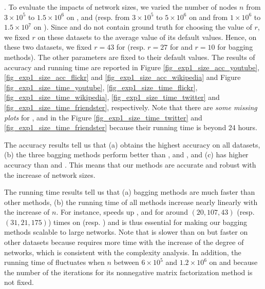 . To evaluate the impacts of network sizes, we varied the
number of nodes $n$ from $3\times 10^5$ to $1.5\times 10^6$ on \YouTube, \Flickr and \Wikipedia (resp.
from $3\times 10^5$ to $5\times 10^6$ on \Twitter and from $1\times 10^6$ to $1.5\times 10^7$ on
\Friendster). Since \Twitter and \Friendster do not contain
ground truth for choosing the value of $r$, we fixed $r$ on these datasets to the average value of
its default values. Hence, on these two datasets, we fixed $r = 43$ for \NMF
(resp. $r = 27$ for \BIGCLAM and $r = 10$ for bagging methods).
The other parameters are fixed to their default values.
The results of accuracy and running time are reported in Figure \ref{fig_exp1_size_acc_youtube},
\ref{fig_exp1_size_acc_flickr} and \ref{fig_exp1_size_acc_wikipedia} and Figure \ref{fig_exp1_size_time_youtube},
\ref{fig_exp1_size_time_flickr}, \ref{fig_exp1_size_time_wikipedia}, \ref{fig_exp1_size_time_twitter} and
\ref{fig_exp1_size_time_friendster}, respectively. Note that there are {\em some missing plots} for \NMF, \Aa and
\BIGCLAM in the Figure \ref{fig_exp1_size_time_twitter} and
\ref{fig_exp1_size_time_friendster} because their running time
is beyond 24 hours.



The accuracy results tell us that (a) \Biased obtains the highest accuracy on all
datasets, (b) the three bagging methods perform better than \NMF, \Aa and \BIGCLAM,
and (c) \NMF has higher accuracy than \Aa and \BIGCLAM. This means that
our methods are accurate and robust with the increase of network sizes.

The running time results tell us that (a) bagging methods are much faster than other methods,
(b) the running time of all methods increase nearly linearly with the increase of $n$. For
instance, \Biased speeds up \NMF, \Aa and \BIGCLAM for around $(20, 107, 43)$ (resp. $(31, 21, 175)$)
times on \Twitter (resp. \Friendster) and is thus essential for
making our bagging methods scalable to large networks. Note
that \NMF is slower than \BIGCLAM on \YouTube but faster on other datasets
because \BIGCLAM requires more time with the increase of the degree of networks,
which is consistent with the complexity analysis.
In addition, the running time of \BIGCLAM fluctuates when
$n$ between $6\times 10^5$ and $1.2\times 10^6$ on \YouTube and \Flickr because the number of
the iterations for its nonnegative matrix factorization method is not fixed.



